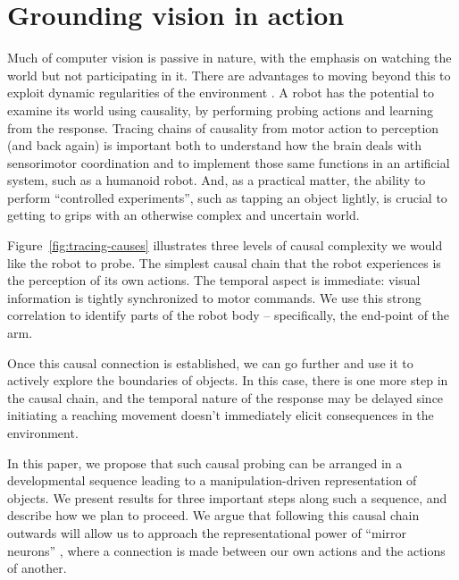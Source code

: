 \section{Grounding vision in action}

Much of computer vision is passive in nature, with the emphasis on
watching the world but not participating in it.  There are advantages
to moving beyond this to exploit dynamic regularities of the
environment \cite{ballard91animate}.
A robot has the
potential to examine its world using causality, by performing probing
actions and learning from the response.  Tracing chains of causality
from motor action to perception (and back again) is important both to
understand how the brain deals with sensorimotor coordination and to
implement those same functions in an artificial system, such as a
humanoid robot.  And, as a practical matter, the ability to perform
``controlled experiments'', such as tapping an object lightly, is
crucial to getting to grips with an otherwise complex and uncertain
world.

Figure~\ref{fig:tracing-causes} illustrates three levels of causal complexity
we would like the robot to probe.
The simplest causal chain that the robot experiences is the
perception of its own actions.  The temporal aspect is immediate:
visual information is tightly synchronized to motor commands.
We use this strong correlation to identify parts of the robot
body -- specifically, the end-point of the arm. 

Once this causal connection is established, we can go further and use
it to actively explore the boundaries of objects.  In this case, there
is one more step in the causal chain, and the temporal nature of
the response may be delayed since initiating a reaching movement doesn't
immediately elicit consequences in the environment.  


In this paper, we propose that such causal probing can be arranged in
a developmental sequence leading to a manipulation-driven
representation of objects.  We present results for three important
steps along such a sequence, and describe how we plan to proceed.  We
argue that following this causal chain outwards will allow us to
approach the representational power of ``mirror neurons''
\cite{gallese-fadiga-fogassi-rizzolatti-1996}, where a connection 
is made between our own actions and the actions of another.  


